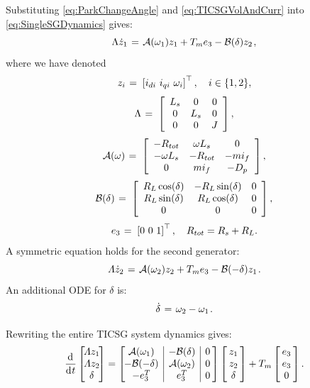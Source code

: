 \documentclass[letterpaper,10pt,conference]{ieeeconf}
\newcommand{\BE}{\begin{equation}}
\newcommand{\BEQ}[1]{\BE\label{#1}} %
\renewcommand{\L}    {{\Lambda}}
\renewcommand{\o}    {{\omega}}
\newcommand{\m}      {{\hbox{\hskip 1pt}}}
\newcommand{\nm}     {{\hbox{\hskip -3pt}}}
\newcommand{\dd}     {{\rm d\hbox{\hskip 0.5pt}}}
\newcommand{\Amscr}  {{\mathcal{A}}}
\newcommand{\Bmscr}  {{\mathcal{B}}}
\begin{document}
Substituting \eqref{eq:ParkChangeAngle} and \eqref{eq:TICSGVolAndCurr}
into \eqref{eq:SingleSGDynamics} gives:
$$ \L\dot{z}_1 \m=\m \Amscr(\o_1)z_1+T_m e_3 - \Bmscr(\delta)z_2 \m,$$
where we have denoted
\BEQ{fiuk_szultesnapja}
   z_i \m=\m \left[i_{di}\ i_{qi}\ \o_i\right]^\top,\quad 
   i\in\{1,2\},
\end{equation}
$$ \L \m=\m \left[\begin{array}{ccc} L_s & 0 & 0\\
   0 & L_s & 0\\ 0 & 0 & J \end{array}\right],$$
$$ \Amscr(\o) \m=\m \left[\begin{array}{ccc}
   -R_{tot} & \o L_s & 0\\ -\o L_s & -R_{tot} & -mi_{f}\\
   0 & mi_{f} & -D_{p} \end{array}\right],$$
$$ \Bmscr(\delta) \m=\m \left[\begin{array}{ccc}
   R_L\cos(\delta) & -R_{L}\sin(\delta) & 0\\ R_L\sin(\delta) & 
   R_L\cos(\delta) & 0\\ 0 & 0 & 0 \end{array}\right],$$
$$e_3 \m=\m \left[0\ 0\ 1\right]^\top, \quad  R_{tot}=R_{s}+R_{L}.$$
A symmetric equation holds for the second generator:
$$ \varLambda\dot{z}_2 \m=\m \mathcal{A}(\o_{2})z_{2}+T_{m}e_{3} -
   \mathcal{B}(-\delta)z_{1} \m.$$
An additional ODE for $\delta$ is:
$$\dot{\delta} \m=\m \o_2-\o_1 \m.$$

Rewriting the entire TICSG system dynamics gives:
\begin{equation} \label{eq:TICSGDynamics}
   \frac{\dd}{\dd t}\left[\nm\nm\begin{array}{c} \varLambda z_{1}\\
   \varLambda z_{2}\\ \delta \end{array}\nm\nm\right] = \left[\nm
   \nm\begin{array}{c|c|c} \mathcal{A}(\o_1) & -\mathcal{B}(\delta)
   & 0\\ -\mathcal{B}(-\delta) & \mathcal{A}(\o_2) & 0\\ -e_{3}^T
   & e_3^T & 0 \end{array}\nm\right] \left[\nm\begin{array}{c} z_1
   \\ z_2\\ \delta \end{array}\nm\right] + T_m \left[\nm 
   \begin{array}{c} e_{3}\\ e_{3}\\ 0 \end{array} \nm\right].
\end{equation}
\end{document}
